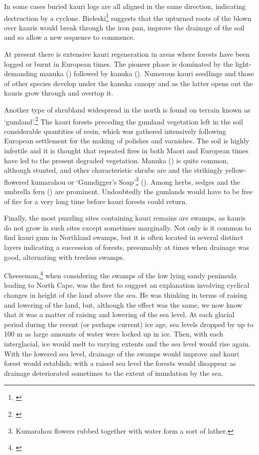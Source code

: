 In some cases buried kauri logs are all aligned in the same direction, indicating destruction by a cyclone.
Bieleski\footnote{\cite{bieleski1959factors}} suggests that the upturned roots of the blown over kauris would break through the iron pan, improve the drainage of the soil and so allow a new sequence to commence.

At present there is extensive kauri regeneration in areas where forests have been logged or burnt in European times.
The pioneer phase is dominated by the light-demanding manuka () followed by kanuka ().
Numerous kauri seedlings and those of other species develop under the kanuka canopy and as the latter opens out the kauris grow through and overtop it.

Another type of shrubland widespread in the north is found on terrain known as `gumland'.\footnote{\cite{esler1975gumland}}
The kauri forests preceding the gumland vegetation left in the soil considerable quantities of resin, which was gathered intensively following European settlement for the making of polishes and varnishes.
The soil is highly infertile and it is thought that repeated fires in both Maori and European times have led to the present degraded vegetation.
Manuka () is quite common, although stunted, and other characteristic shrubs are  and the strikingly yellow-flowered kumarahou or `Gumdigger's Soap'\footnote{Kumarahou flowers rubbed together with water form a sort of lather.} ().
Among herbs, sedges and the umbrella fern () are prominent.
Undoubtedly the gumlands would have to be free of fire for a very long time before kauri forests could return.

Finally, the most puzzling sites containing kauri remains are swamps, as kauris do not grow in such sites except sometimes marginally.
Not only is it common to find kauri gum in Northland swamps, but it is often located in several distinct layers indicating a succession of forests, presumably at times when drainage was good, alternating with treeless swamps.

Cheeseman,\footnote{\cite{cheeseman1896flora}} when considering the swamps of the low lying sandy peninsula leading to North Cape, was the first to suggest an explanation involving cyclical changes in height of the land above the sea.
He was thinking in terms of raising and lowering of the land, but, although the effect was the same, we now know that it was a matter of raising and lowering of the sea level.
At each glacial period during the recent (or perhaps current) ice age, sea levels dropped by up to 100 m as large amounts of water were locked up in ice.
Then, with each interglacial, ice would melt to varying extents and the sea level would rise again.
With the lowered sea level, drainage of the swamps would improve and kauri forest would establish; with a raised sea level the forests would disappear as drainage deteriorated sometimes to the extent of inundation by the sea.

